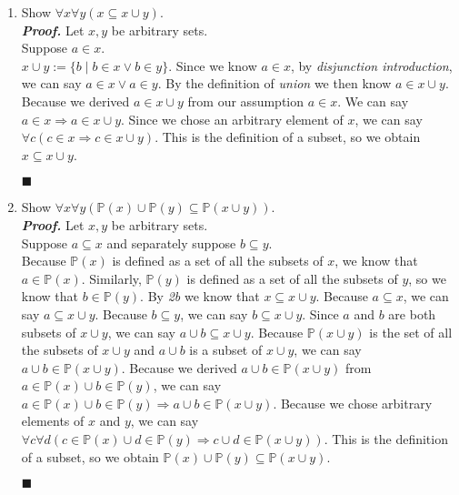 \documentclass[11pt,a4paper]{article}
\begin{document}
\begin{enumerate}
\begin{enumerate}
        \item 
        Show $\forall x \forall y (x \subseteq x \cup y)$. \\
        \emph{\textbf{Proof.}} Let $x, y$ be arbitrary sets. \\
        Suppose $a \in x$. \\
        $x \cup y := \{b \mid  b \in x \lor b \in y \}$. Since we know $a \in x $, by \emph{disjunction introduction}, we can say $a \in x \lor a \in y$. By the definition of \emph{union} we then know $a \in x \cup y$.
        Because we derived $a \in x \cup y$ from our assumption $a \in x$. We can say $a \in x \Rightarrow a \in x \cup y$.
        Since we chose an arbitrary element of $x$, we can say $\forall c (c \in x \Rightarrow c \in x \cup y)$.
        This is the definition of a subset, so we obtain $x \subseteq x \cup y$.   
        \begin{flushright}
            $\blacksquare$
        \end{flushright}

        \item 
        Show $\forall x \forall y (\mathbb{P} (x) \cup \mathbb{P} (y) \subseteq \mathbb{P} (x \cup y))$. \\
        \emph{\textbf{Proof.}} Let $x, y$ be arbitrary sets. \\
        Suppose $a \subseteq x$ and separately suppose $b \subseteq y$. \\
        Because $\mathbb{P} (x)$ is defined as a set of all the subsets of $x$, we know that $a \in \mathbb{P} (x) $.
        Similarly, $\mathbb{P} (y) $ is defined as a set of all the subsets of $y$, so we know that $b \in \mathbb{P} (y) $.
        By \emph{2b} we know that $x \subseteq x \cup y$. Because $a \subseteq x$, we can say $a \subseteq x \cup y$.
        Because $b \subseteq y$, we can say $b \subseteq x \cup y$. Since $a$ and $b$ are both subsets of $x \cup y$, we can say $a \cup b \subseteq x \cup y$. 
        Because $\mathbb{P} (x \cup y)$ is the set of all the subsets of $x \cup y$ and $a \cup b$ is a subset of $x \cup y$, we can say $a \cup b \in \mathbb{P} (x \cup y)$.
        Because we derived $a \cup b \in \mathbb{P} (x \cup y)$ from $a \in \mathbb{P} (x) \cup b \in \mathbb{P} (y)$,
        we can say $a \in \mathbb{P} (x) \cup b \in \mathbb{P} (y) \Rightarrow a \cup b \in \mathbb{P} (x \cup y)$. Because we chose arbitrary elements of $x$ and $y$, 
        we can say $\forall c \forall d (c \in \mathbb{P} (x) \cup d \in \mathbb{P} (y) \Rightarrow c \cup d \in \mathbb{P} (x \cup y))$.
        This is the definition of a subset, so we obtain $\mathbb{P} (x) \cup \mathbb{P} (y) \subseteq \mathbb{P} (x \cup y)$.  
        \begin{flushright}
            $\blacksquare$
        \end{flushright}


\end{enumerate}
\end{enumerate}
\end{document}
